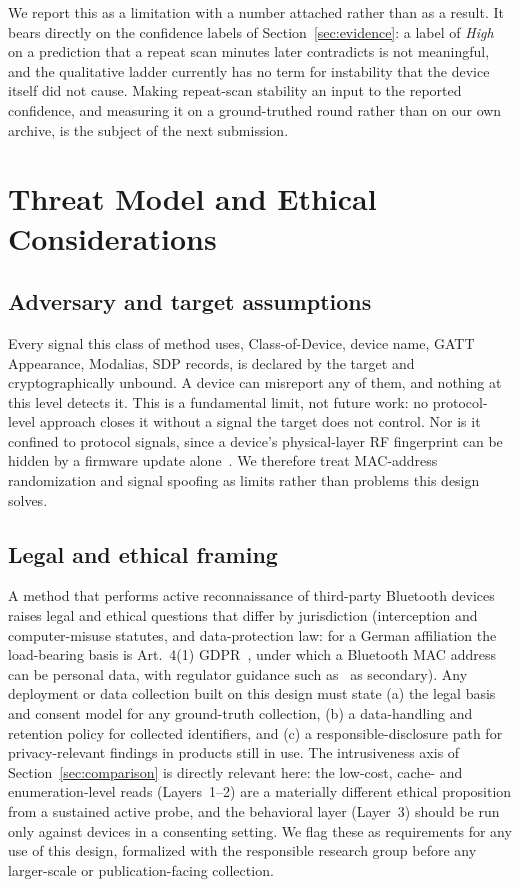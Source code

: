 \documentclass[conference]{IEEEtran}
\begin{document}
We report this as a limitation with a number attached rather than as a result.
It bears directly on the confidence labels of
Section~\ref{sec:evidence}: a label of \emph{High} on a prediction that a
repeat scan minutes later contradicts is not meaningful, and the qualitative
ladder currently has no term for instability that the device itself did not
cause. Making repeat-scan stability an input to the reported confidence, and
measuring it on a ground-truthed round rather than on our own archive, is the
subject of the next submission.

\section{Threat Model and Ethical Considerations}\label{sec:threat}
\subsection{Adversary and target assumptions}
Every signal this class of method uses, Class-of-Device, device name, GATT
Appearance, Modalias, SDP records, is declared by the target and
cryptographically unbound. A device can misreport any of them, and nothing at
this level detects it. This is a fundamental limit, not future work: no
protocol-level approach closes it without a signal the target does not
control. Nor is it confined to protocol signals, since a device's
physical-layer RF fingerprint can be hidden by a firmware update
alone~\cite{ucsd2024firmware}. We therefore treat MAC-address randomization
and signal spoofing as limits rather than problems this design solves.

\subsection{Legal and ethical framing}
A method that performs active reconnaissance of third-party Bluetooth
devices raises legal and ethical questions that differ by jurisdiction
(interception and computer-misuse statutes, and data-protection law: for
a German affiliation the load-bearing basis is Art.~4(1)
GDPR~\cite{gdpr2016art4}, under which a Bluetooth MAC address can be
personal data, with regulator guidance such as~\cite{cnil2020macaudience}
as secondary). Any deployment or data collection built
on this design must state (a) the legal basis and consent model for any
ground-truth collection, (b) a data-handling and retention policy for
collected identifiers, and (c) a responsible-disclosure path for
privacy-relevant findings in products still in use. The intrusiveness
axis of Section~\ref{sec:comparison} is directly relevant here: the
low-cost, cache- and enumeration-level reads (Layers~1--2) are a
materially different ethical proposition from a sustained active probe,
and the behavioral layer (Layer~3) should be run only against devices in
a consenting setting. We flag these as requirements for any use of this
design, formalized with the responsible research group before any
larger-scale or publication-facing collection.
\end{document}
